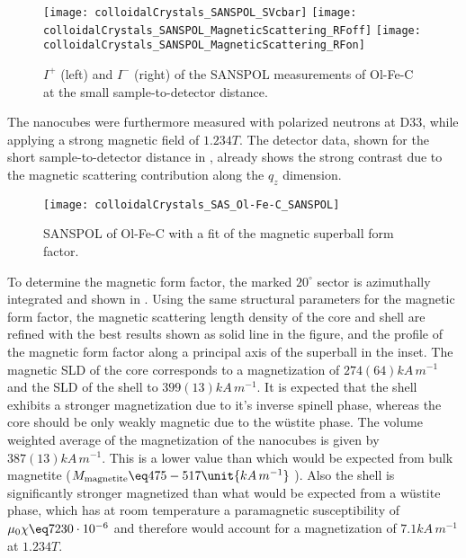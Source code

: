 \documentclass[\main/dresen_thesis.tex]{subfiles}
\begin{document}
    \begin{figure}[tb]
      \centering
      \texttt{[image: colloidalCrystals\_SANSPOL\_SVcbar]}
      \texttt{[image: colloidalCrystals\_SANSPOL\_MagneticScattering\_RFoff]}
      \texttt{[image: colloidalCrystals\_SANSPOL\_MagneticScattering\_RFon]}
      \caption{\label{fig:colloidalCrystals:nanoparticle:sanspolDetectorImage}$I^{+}$ (left) and $I^{-}$ (right) of the SANSPOL measurements of Ol-Fe-C at the small sample-to-detector distance.}
    \end{figure}

    The nanocubes were furthermore measured with polarized neutrons at D33, while applying a strong magnetic field of $1.234 \unit{T}$.
    The detector data, shown for the short sample-to-detector distance in , already shows the strong contrast due to the magnetic scattering contribution along the $q_z$ dimension.

    \begin{figure}[htbp]
      \centering
      \texttt{[image: colloidalCrystals\_SAS\_Ol-Fe-C\_SANSPOL]}
      \caption{\label{fig:colloidalCrystals:nanoparticle:sanspol}SANSPOL of Ol-Fe-C with a fit of the magnetic superball form factor.}
    \end{figure}

    To determine the magnetic form factor, the marked $20 ^\circ$ sector is azimuthally integrated and shown in .
    Using the same structural parameters for the magnetic form factor, the magnetic scattering length density of the core and shell are refined with the best results shown as solid line in the figure, and the profile of the magnetic form factor along a principal axis of the superball in the inset.
    The magnetic SLD of the core corresponds to a magnetization of $274(64) \unit{kA \, m^{-1}}$ and the SLD of the shell to $399(13) \unit{kA \, m^{-1}}$.
    It is expected that the shell exhibits a stronger magnetization due to it's inverse spinell phase, whereas the core should be only weakly magnetic due to the w\"ustite phase.
    The volume weighted average of the magnetization of the nanocubes is given by $387(13) \unit{kA \, m^{-1}}$.
    This is a lower value than which would be expected from bulk magnetite ($M_\mathrm{magnetite} \eq 475 - 517 \unit{kA \, m^{-1}}$ \cite{Cornell_2003_Their, Handley_2000_Moder}).
    Also the shell is significantly stronger magnetized than what would be expected from a w\"ustite phase, which has at room temperature a paramagnetic susceptibility of $\mu_0 \chi \eq 7230 \cdot 10^{-6}$ \cite{Lide_2004_Handb} and therefore would account for a magnetization of $7.1 \unit{kA \, m^{-1}}$ at $1.234 \unit{T}$.
\end{document}
